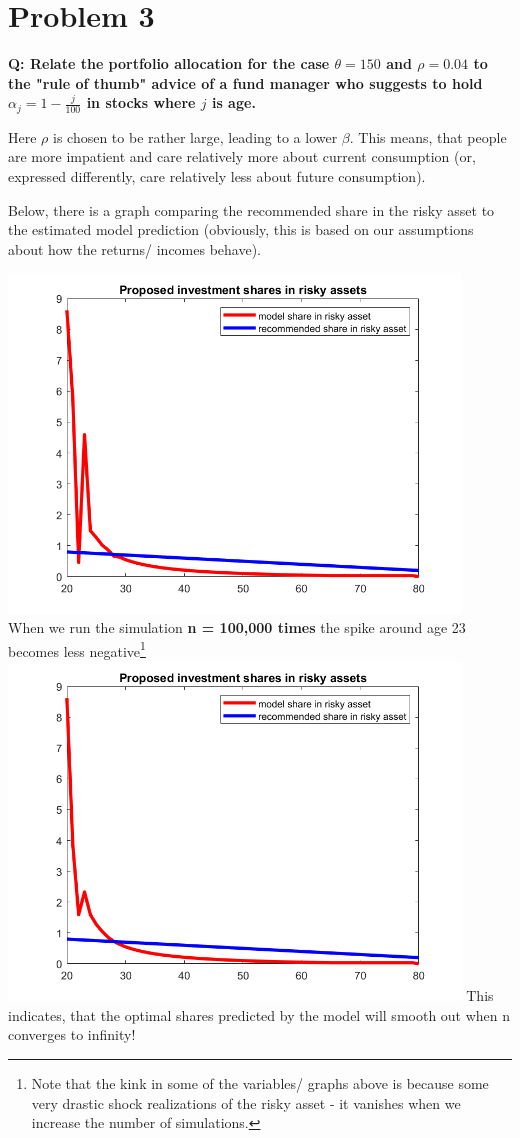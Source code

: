\documentclass[12pt,a4paper]{article}
\begin{document}
\section*{Problem 3}
\textbf{Q: Relate the portfolio allocation for the case $\theta = 150$ and $\rho = 0.04$ to the "rule of thumb" advice of a fund manager who suggests to hold $\alpha_j = 1- \frac{j}{100}$ in stocks where $j$ is age.}

Here $\rho$ is chosen to be rather large, leading to a lower $\beta$. This means, that people are more impatient and care relatively more about current consumption (or, expressed differently, care relatively less about future consumption).

Below, there is a graph comparing the recommended share in the risky asset to the estimated model prediction (obviously, this is based on our assumptions about how the returns/ incomes behave).

\includegraphics[width = 0.9\textwidth]{PS3/sharesriskyasset.png}
\\
When we run the simulation \textbf{n = 100,000 times} the spike around age 23 becomes less negative\footnote{Note that the kink in some of the variables/ graphs above is because some very drastic shock realizations of the risky asset - it vanishes when we increase the number of simulations.}\\
\includegraphics[width = 0.9\textwidth]{PS3/sharesriskyassetns100000.png}
This indicates, that the optimal shares predicted by the model will smooth out when n converges to infinity!
\end{document}
